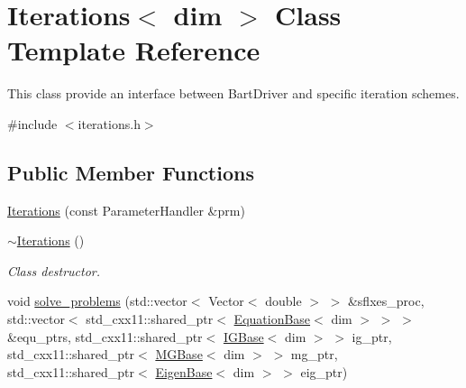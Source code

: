 \hypertarget{class_iterations}{}\section{Iterations$<$ dim $>$ Class Template Reference}
\label{class_iterations}


This class provide an interface between Bart\+Driver and specific iteration schemes.  




{\ttfamily \#include $<$iterations.\+h$>$}

\subsection*{Public Member Functions}
\begin{DoxyCompactItemize}
\item 
\hyperlink{class_iterations_a0355678383cd174840beb772ce7e9e8d}{Iterations} (const Parameter\+Handler \&prm)
\item 
\hyperlink{class_iterations_ae6ea082615afe8919000b4ea1465f9cf}{$\sim$\+Iterations} ()
\begin{DoxyCompactList}\small\item\em Class destructor. \end{DoxyCompactList}\item 
void \hyperlink{class_iterations_ae41347e35b05b6f0fd3cb2a03ab60341}{solve\+\_\+problems} (std\+::vector$<$ Vector$<$ double $>$ $>$ \&sflxes\+\_\+proc, std\+::vector$<$ std\+\_\+cxx11\+::shared\+\_\+ptr$<$ \hyperlink{class_equation_base}{Equation\+Base}$<$ dim $>$ $>$ $>$ \&equ\+\_\+ptrs, std\+\_\+cxx11\+::shared\+\_\+ptr$<$ \hyperlink{class_i_g_base}{I\+G\+Base}$<$ dim $>$ $>$ ig\+\_\+ptr, std\+\_\+cxx11\+::shared\+\_\+ptr$<$ \hyperlink{class_m_g_base}{M\+G\+Base}$<$ dim $>$ $>$ mg\+\_\+ptr, std\+\_\+cxx11\+::shared\+\_\+ptr$<$ \hyperlink{class_eigen_base}{Eigen\+Base}$<$ dim $>$ $>$ eig\+\_\+ptr)
\end{DoxyCompactItemize}
